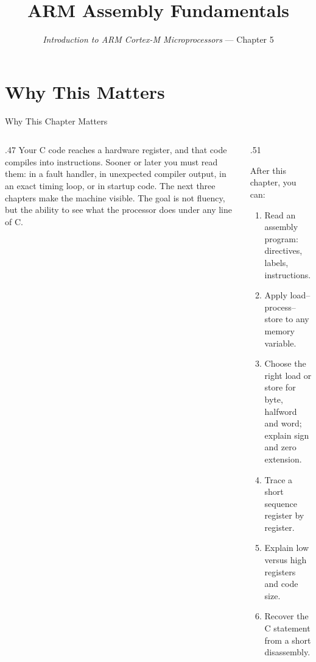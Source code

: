 \documentclass[9pt,aspectratio=169,xcolor=table]{beamer}
\title{ARM Assembly Fundamentals}
\subtitle{\emph{Introduction to ARM Cortex-M Microprocessors} --- Chapter 5}
\begin{document}
\titlepage

\section{Why This Matters}

\begin{frame}{Why This Chapter Matters}
    \begin{columns}[T]
    \begin{column}{.47\textwidth}
        {\normalsize Your C code reaches a hardware register, and that code compiles into instructions. Sooner or later you must read them: in a fault handler, in unexpected compiler output, in an exact timing loop, or in startup code. The next three chapters make the machine visible. The goal is not fluency, but the ability to see what the processor does under any line of C.}
    \end{column}
    \begin{column}{.51\textwidth}
        \begin{block}{After this chapter, you can:}
        {\small
        \begin{enumerate}\itemsep2pt
            \item Read an assembly program: directives, labels, instructions.
            \item Apply load--process--store to any memory variable.
            \item Choose the right load or store for byte, halfword and word; explain sign and zero extension.
            \item Trace a short sequence register by register.
            \item Explain low versus high registers and code size.
            \item Recover the C statement from a short disassembly.
        \end{enumerate}}
        \end{block}
    \end{column}
    \end{columns}
\end{frame}
\end{document}
